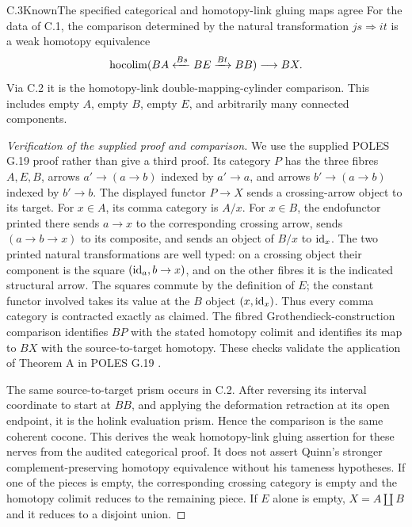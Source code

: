 \begin{statement}{C.3}{Known}{The specified categorical and homotopy-link gluing maps agree}
For the data of C.1, the comparison determined by the natural transformation $js\Rightarrow it$ is a weak homotopy equivalence
\[
 \operatorname*{hocolim}(BA\xleftarrow{Bs}BE\xrightarrow{Bt}BB)\longrightarrow BX.
\]
Via C.2 it is the homotopy-link double-mapping-cylinder comparison. This includes empty $A$, empty $B$, empty $E$, and arbitrarily many connected components.
\end{statement}
\begin{proof}[Verification of the supplied proof and comparison]
We use the supplied POLES G.19 proof rather than give a third proof. Its category $P$ has the three fibres $A,E,B$, arrows $a'\to(a\to b)$ indexed by $a'\to a$, and arrows $b'\to(a\to b)$ indexed by $b'\to b$. The displayed functor $P\to X$ sends a crossing-arrow object to its target. For $x\in A$, its comma category is $A/x$. For $x\in B$, the endofunctor printed there sends $a\to x$ to the corresponding crossing arrow, sends $(a\to b\to x)$ to its composite, and sends an object of $B/x$ to $\mathrm{id}_x$. The two printed natural transformations are well typed: on a crossing object their component is the square $(\mathrm{id}_a,b\to x)$, and on the other fibres it is the indicated structural arrow. The squares commute by the definition of $E$; the constant functor involved takes its value at the $B$ object $(x,\mathrm{id}_x)$. Thus every comma category is contracted exactly as claimed. The fibred Grothendieck-construction comparison identifies $BP$ with the stated homotopy colimit and identifies its map to $BX$ with the source-to-target homotopy. These checks validate the application of Theorem A in POLES G.19 \citep{CDPOLES2026}.

The same source-to-target prism occurs in C.2. After reversing its interval coordinate to start at $BB$, and applying the deformation retraction at its open endpoint, it is the holink evaluation prism. Hence the comparison is the same coherent cocone. This derives the weak homotopy-link gluing assertion for these nerves from the audited categorical proof. It does not assert Quinn's stronger complement-preserving homotopy equivalence without his tameness hypotheses. If one of the pieces is empty, the corresponding crossing category is empty and the homotopy colimit reduces to the remaining piece. If $E$ alone is empty, $X=A\amalg B$ and it reduces to a disjoint union.
\end{proof}

